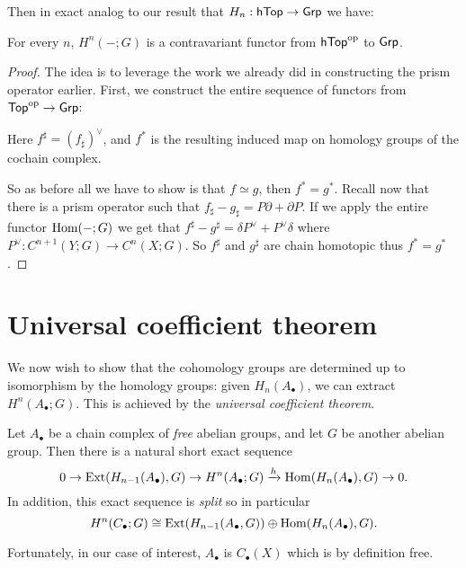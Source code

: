 Then in exact analog to our result that $H_n : \mathsf{hTop} \to \mathsf{Grp}$ we have:
\begin{theorem}
	For every $n$, $H^n(-;G)$ is a contravariant functor
	from $\mathsf{hTop}^{\mathrm{op}}$ to $\mathsf{Grp}$.
\end{theorem}
\begin{proof}
	The idea is to leverage the work we already did in constructing
	the prism operator earlier.
	First, we construct the entire sequence of functors
	from $\mathsf{Top}^{\mathrm{op}} \to \mathsf{Grp}$:
	\begin{center}
	\end{center}
	Here $f^\sharp = (f_\sharp)^\vee$, and $f^\ast$
	is the resulting induced map on homology groups of the cochain complex.

	So as before all we have to show is that $f \simeq g$,
	then $f^\ast = g^\ast$.
	Recall now that there is a prism operator such that
	$f_\sharp - g_\sharp = P \partial + \partial P$.
	If we apply the entire functor $\operatorname{Hom}(-;G)$ we get that
	$f^\sharp - g^\sharp = \delta P^\vee + P^\vee \delta$
	where $P^\vee : C^{n+1}(Y;G) \to C^n(X;G)$.
	So $f^\sharp$ and $g^\sharp$ are chain homotopic thus $f^\ast = g^\ast$.
\end{proof}


\section{Universal coefficient theorem}
We now wish to show that the cohomology groups are determined up to isomorphism
by the homology groups: given $H_n(A_\bullet)$, we can extract $H^n(A_\bullet; G)$.
This is achieved by the \emph{universal coefficient theorem}.
\begin{theorem}
	Let $A_\bullet$ be a chain complex of \emph{free} abelian groups,
	and let $G$ be another abelian group.
	Then there is a natural short exact sequence
	\[
		0 \to \operatorname{Ext}(H_{n-1}(A_\bullet), G) \to H^n(A_\bullet; G)
		\xrightarrow{h} \operatorname{Hom}(H_n(A_\bullet), G) \to 0. \]
	In addition, this exact sequence is \emph{split}
	so in particular
	\[ H^n(C_\bullet; G) \cong \operatorname{Ext}(H_{n-1}(A_\bullet, G))
		\oplus \operatorname{Hom}(H_n(A_\bullet), G). \]
\end{theorem}
Fortunately, in our case of interest, $A_\bullet$ is $C_\bullet(X)$
which is by definition free.

